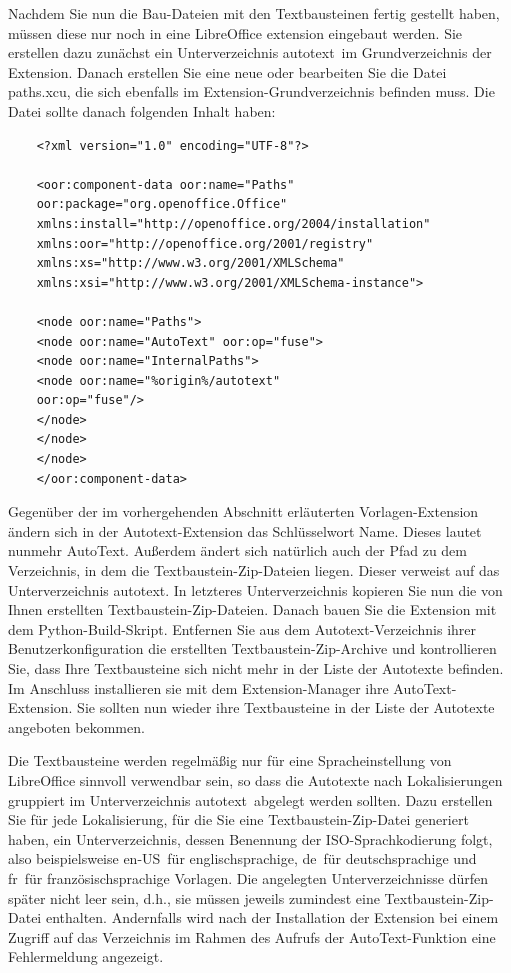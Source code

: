 \documentclass[12pt,a4paper,titlepage]{book}
\begin{document}
Nachdem Sie nun die Bau-Dateien mit den Textbausteinen fertig gestellt haben, müssen diese nur noch in eine LibreOffice extension eingebaut werden. Sie erstellen dazu zunächst ein Unterverzeichnis \glqq autotext\grqq~im Grundverzeichnis der Extension. Danach erstellen Sie eine neue oder bearbeiten Sie die Datei \glqq paths.xcu\grqq, die sich ebenfalls im Extension-Grundverzeichnis befinden muss. Die Datei sollte danach folgenden Inhalt haben:


\begin{lstlisting}
	<?xml version="1.0" encoding="UTF-8"?>
	
	<oor:component-data oor:name="Paths" 
	oor:package="org.openoffice.Office" 
	xmlns:install="http://openoffice.org/2004/installation" 
	xmlns:oor="http://openoffice.org/2001/registry"
	xmlns:xs="http://www.w3.org/2001/XMLSchema" 
	xmlns:xsi="http://www.w3.org/2001/XMLSchema-instance">
	
	<node oor:name="Paths">
	<node oor:name="AutoText" oor:op="fuse">
	<node oor:name="InternalPaths">
	<node oor:name="%origin%/autotext" 
	oor:op="fuse"/>
	</node>
	</node>
	</node>
	</oor:component-data>
\end{lstlisting}

Gegenüber der im vorhergehenden Abschnitt erläuterten Vorlagen-\linebreak Extension ändern sich in der Autotext-Extension das Schlüsselwort \glqq Name\grqq. Dieses lautet nunmehr \glqq AutoText\grqq. Außerdem ändert sich natürlich auch der Pfad zu dem Verzeichnis, in dem die Textbaustein-Zip-Dateien liegen. Dieser verweist auf das Unterverzeichnis \glqq autotext\grqq. In letzteres Unterverzeichnis kopieren Sie nun die von Ihnen erstellten Textbaustein-Zip-Dateien. Danach bauen Sie die Extension mit dem Python-Build-Skript. Entfernen Sie aus dem Autotext-Verzeichnis ihrer Benutzerkonfiguration die erstellten Textbaustein-Zip-Archive und kontrollieren Sie, dass Ihre Textbausteine sich nicht mehr in der Liste der Autotexte befinden. Im Anschluss installieren sie mit dem Extension-Manager ihre AutoText-Extension. Sie sollten nun wieder ihre Textbausteine in der Liste der Autotexte angeboten bekommen.

Die Textbausteine werden regelmäßig nur für eine Spracheinstellung von LibreOffice sinnvoll verwendbar sein, so dass die Autotexte nach Lokalisierungen gruppiert im Unterverzeichnis \glqq autotext\grqq~abgelegt werden sollten. Dazu erstellen Sie für jede Lokalisierung, für die Sie eine Textbaustein-Zip-Datei generiert haben, ein Unterverzeichnis, dessen Benennung der ISO-Sprachkodierung folgt, also  beispielsweise \glqq en-US\grqq~für englischsprachige, \glqq de\grqq~\linebreak für deutschsprachige und \glqq fr\grqq~für französischsprachige Vorlagen. Die angelegten Unterverzeichnisse dürfen später nicht leer sein, d.h., sie müssen jeweils zumindest eine Textbaustein-Zip-Datei enthalten. Andernfalls wird nach der Installation der Extension bei einem Zugriff auf das Verzeichnis im Rahmen des Aufrufs der AutoText-Funktion eine Fehlermeldung angezeigt.
\end{document}
